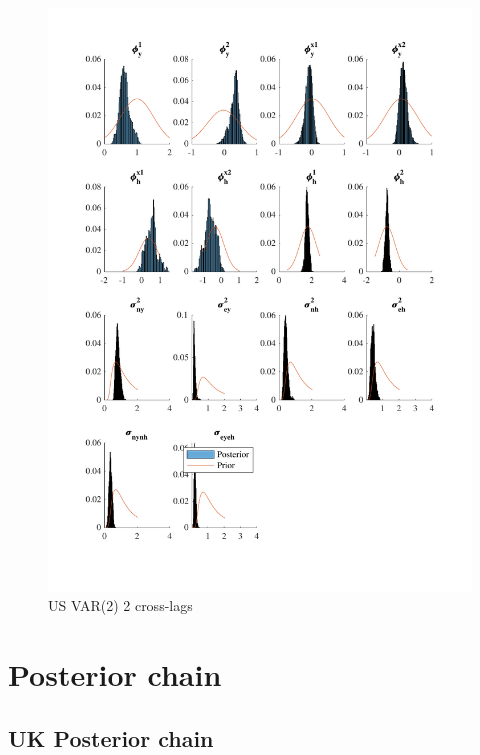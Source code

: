 \documentclass[
  12pt,
]{article}
\begin{document}
\begin{figure}

{\centering \includegraphics[width=0.85\linewidth]{../../Regression/Bayesian_UC_VAR2_nodrift_Crosscycle2lags/OutputData/posteriorpriordistribution_US} 

}

\caption{US VAR(2) 2 cross-lags}\label{fig:unnamed-chunk-14}
\end{figure}

\clearpage

\hypertarget{posterior-chain}{%
\section{Posterior chain}\label{posterior-chain}}

\hypertarget{uk-posterior-chain}{%
\subsection{UK Posterior chain}\label{uk-posterior-chain}}
\end{document}
